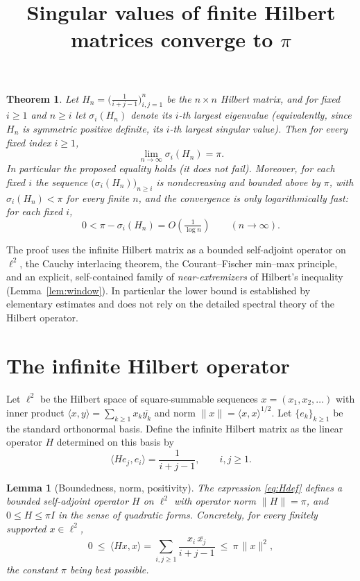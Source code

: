 \documentclass[12pt]{article}
\newtheorem{theorem}{Theorem}
\newtheorem{lemma}{Lemma}
\theoremstyle{remark}
\begin{document}
\title{Singular values of finite Hilbert matrices converge to $\pi$}
\author{}
\date{}
\maketitle

\begin{theorem}\label{thm:main}
Let $H_n=\bigl(\tfrac{1}{i+j-1}\bigr)_{i,j=1}^{n}$ be the $n\times n$ Hilbert matrix, and for
fixed $i\ge 1$ and $n\ge i$ let $\sigma_i(H_n)$ denote its $i$-th largest eigenvalue
(equivalently, since $H_n$ is symmetric positive definite, its $i$-th largest singular value).
Then for \emph{every} fixed index $i\ge 1$,
\[
\lim_{n\to\infty}\sigma_i(H_n)=\pi .
\]
In particular the proposed equality \emph{holds} (it does not fail).
Moreover, for each fixed $i$ the sequence $\bigl(\sigma_i(H_n)\bigr)_{n\ge i}$ is nondecreasing
and bounded above by $\pi$, with $\sigma_i(H_n)<\pi$ for every finite $n$, and the convergence is
only logarithmically fast: for each fixed $i$,
\[
0<\pi-\sigma_i(H_n)=O\!\left(\tfrac1{\log n}\right)\qquad(n\to\infty).
\]
\end{theorem}

The proof uses the infinite Hilbert matrix as a bounded self-adjoint operator on $\ell^2$,
the Cauchy interlacing theorem, the Courant--Fischer min--max principle, and an explicit,
self-contained family of \emph{near-extremizers} of Hilbert's inequality (Lemma~\ref{lem:window}).
In particular the lower bound is established by elementary estimates and does not rely on the
detailed spectral theory of the Hilbert operator.

\section{The infinite Hilbert operator}

Let $\ell^2$ be the Hilbert space of square-summable sequences
$x=(x_1,x_2,\dots)$ with inner product $\langle x,y\rangle=\sum_{k\ge1}x_k\overline{y_k}$ and
norm $\|x\|=\langle x,x\rangle^{1/2}$. Let $\{e_k\}_{k\ge1}$ be the standard orthonormal basis.
Define the infinite Hilbert matrix as the linear operator $H$ determined on this basis by
\begin{equation}\label{eq:Hdef}
\langle He_j,e_i\rangle=\frac{1}{i+j-1},\qquad i,j\ge1 .
\end{equation}

\begin{lemma}[Boundedness, norm, positivity]\label{lem:bounded}
The expression \eqref{eq:Hdef} defines a bounded self-adjoint operator $H$ on $\ell^2$ with
operator norm $\|H\|=\pi$, and $0\le H\le \pi I$ in the sense of quadratic forms. Concretely, for
every finitely supported $x\in\ell^2$,
\begin{equation}\label{eq:hilbertineq}
0\ \le\ \langle Hx,x\rangle=\sum_{i,j\ge1}\frac{x_i\,\overline{x_j}}{i+j-1}\ \le\ \pi\,\|x\|^2 ,
\end{equation}
the constant $\pi$ being best possible.
\end{lemma}
\end{document}
